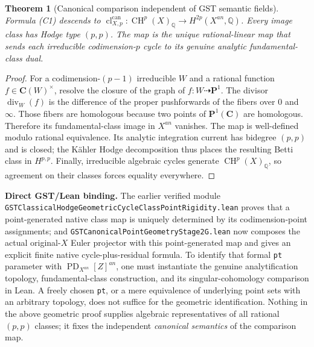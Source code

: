 \documentclass[11pt,a4paper]{article}
\newtheorem{theorem}{Theorem}[section]
\newcommand{\Q}{\mathbb Q}
\newcommand{\CH}{\operatorname{CH}}
\begin{document}
\begin{theorem}[Canonical comparison independent of GST semantic fields]
Formula \textup{(C1)} descends to
\(\operatorname{cl}^{\mathrm{can}}_{X,p}:
\CH^p(X)_\Q\to H^{2p}(X^{an},\Q)\).
Every image class has Hodge type \((p,p)\). The map is the unique
rational-linear map that sends each irreducible codimension-\(p\)
cycle to its genuine analytic fundamental-class dual.
\end{theorem}
\begin{proof}
For a codimension-\((p-1)\) irreducible \(W\) and a rational
function \(f\in\mathbf C(W)^\times\), resolve the closure of the
graph of \(f:W\dashrightarrow\mathbf P^1\).
The divisor \(\operatorname{div}_W(f)\) is the difference of the
proper pushforwards of the fibers over \(0\) and \(\infty\).
Those fibers are homologous because two points of
\(\mathbf P^1(\mathbf C)\) are homologous. Therefore its
fundamental-class image in \(X^{an}\) vanishes. The map is
well-defined modulo rational equivalence. Its analytic
integration current has bidegree \((p,p)\) and is closed;
the K\"ahler Hodge decomposition thus places the resulting
Betti class in \(H^{p,p}\). Finally, irreducible algebraic
cycles generate \(\CH^p(X)_\Q\), so agreement on their classes
forces equality everywhere.
\end{proof}

\noindent\textbf{Direct GST/Lean binding.}
The earlier verified module
\texttt{GSTClassicalHodgeGeometricCycleClassPointRigidity.lean}
proves that a point-generated native class map is uniquely
determined by its codimension-point assignments; and
\texttt{GSTCanonicalPointGeometryStage2G.lean}
now composes the actual original-\(X\) Euler projector with this
point-generated map and gives an explicit finite native
cycle-plus-residual formula. To identify that formal \texttt{pt}
parameter with \(\operatorname{PD}_{X^{an}}[Z]^{an}\),
one must instantiate the genuine analytification topology,
fundamental-class construction, and its singular-cohomology
comparison in Lean. A freely chosen \texttt{pt}, or a mere
equivalence of underlying point sets with an arbitrary topology,
does not suffice for the geometric identification. Nothing in
the above geometric proof supplies algebraic representatives
of all rational \((p,p)\) classes; it fixes the independent
\emph{canonical semantics} of the comparison map.
\end{document}
